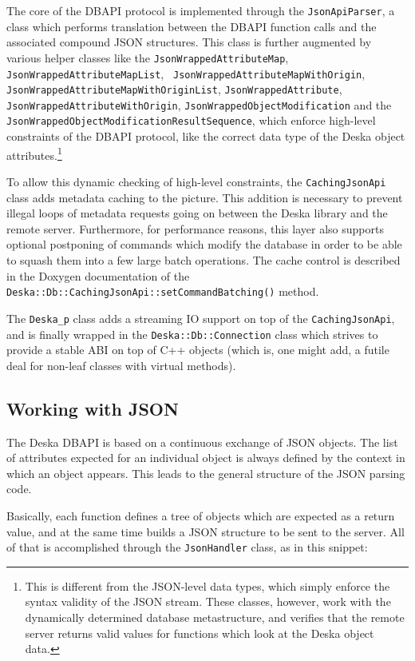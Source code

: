 \documentclass[deska]{subfiles}
\begin{document}
The core of the DBAPI protocol is implemented through the {\tt JsonApiParser}, a class which performs translation
between the DBAPI function calls and the associated compound JSON structures.  This class is further augmented by
various helper classes like the {\tt JsonWrappedAttributeMap}, {\tt JsonWrappedAttributeMapList}, {\tt
JsonWrappedAttributeMapWithOrigin}, {\tt JsonWrappedAttributeMapWithOriginList}, {\tt JsonWrappedAttribute}, {\tt
JsonWrappedAttributeWithOrigin}, {\tt JsonWrappedObjectModification} and the {\tt
JsonWrappedObjectModificationResultSequence}, which enforce high-level constraints of the DBAPI protocol, like the
correct data type of the Deska object attributes.\footnote{This is different from the JSON-level data types, which simply
enforce the syntax validity of the JSON stream.  These classes, however, work with the dynamically determined database
metastructure, and verifies that the remote server returns valid values for functions which look at the Deska object
data.}

To allow this dynamic checking of high-level constraints, the {\tt CachingJsonApi} class adds metadata caching to the
picture.  This addition is necessary to prevent illegal loops of metadata requests going on between the Deska library
and the remote server.  Furthermore, for performance reasons, this layer also supports optional postponing of commands
which modify the database in order to be able to squash them into a few large batch operations.  The cache control is
described in the Doxygen documentation of the {\tt Deska::Db::CachingJsonApi::setCommandBatching()} method.

The {\tt Deska\_p} class adds a streaming IO support on top of the {\tt CachingJsonApi}, and is finally wrapped in the
{\tt Deska::Db::Connection} class which strives to provide a stable ABI on top of C++ objects (which is, one might add,
a futile deal for non-leaf classes with virtual methods).

\subsection{Working with JSON}

The Deska DBAPI is based on a continuous exchange of JSON objects.  The list of attributes expected for an individual
object is always defined by the context in which an object appears.  This leads to the general structure of the JSON
parsing code.

Basically, each function defines a tree of objects which are expected as a return value, and at the same time builds a
JSON structure to be sent to the server.  All of that is accomplished through the {\tt JsonHandler} class, as in this
snippet:
\end{document}
